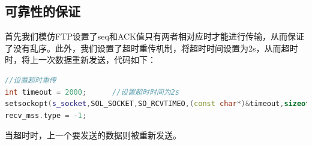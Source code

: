 \subsection{可靠性的保证}

首先我们模仿FTP设置了seq和ACK值只有两者相对应时才能进行传输，从而保证了没有乱序。此外，我们设置了超时重传机制，将超时时间设置为2s，从而超时时，将上一次数据重新发送，代码如下：

\begin{flushleft}
\begin{lstlisting}[language={C++},basicstyle=\footnotesize]
//设置超时重传
int timeout = 2000;      //设置超时时间为2s
setsockopt(s_socket,SOL_SOCKET,SO_RCVTIMEO,(const char*)&timeout,sizeof(int));
recv_mss.type = -1;
\end{lstlisting}
\end{flushleft}

当超时时，上一个要发送的数据则被重新发送。
\clearpage

